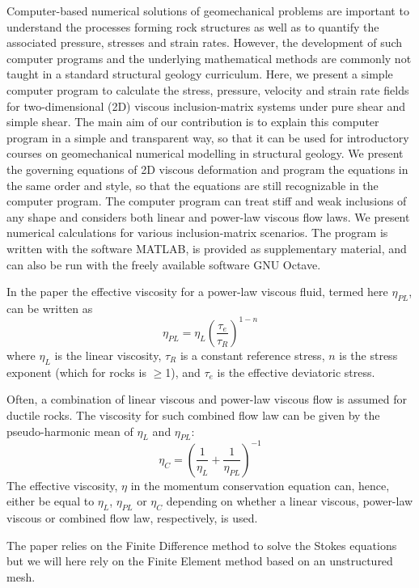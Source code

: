 \begin{center}
\begin{minipage}{13cm}
{\small 
Computer-based numerical solutions of geomechanical problems are important to understand the processes
forming rock structures as well as to quantify the associated pressure, stresses and strain rates. However, the
development of such computer programs and the underlying mathematical methods are commonly not taught in
a standard structural geology curriculum. Here, we present a simple computer program to calculate the stress,
pressure, velocity and strain rate fields for two-dimensional (2D) viscous inclusion-matrix systems under pure
shear and simple shear. The main aim of our contribution is to explain this computer program in a simple and
transparent way, so that it can be used for introductory courses on geomechanical numerical modelling in
structural geology. We present the governing equations of 2D viscous deformation and program the equations in
the same order and style, so that the equations are still recognizable in the computer program. The computer
program can treat stiff and weak inclusions of any shape and considers both linear and power-law viscous flow
laws. We present numerical calculations for various inclusion-matrix scenarios. The program is written with the
software MATLAB, is provided as supplementary material, and can also be run with the freely available software
GNU Octave.}
\end{minipage}
\end{center}
 

In the paper the effective viscosity for a power-law viscous fluid, termed here $\eta_{PL}$, can be written
as
\[
\eta_{PL}=\eta_L \left( \frac{\tau_e}{\tau_R}  \right)^{1-n}
\]
where $\eta_L$ is the linear viscosity, $\tau_R$ is a constant reference stress, 
$n$ is the stress exponent (which for rocks is $\ge$1), and $\tau_e$ is the effective 
deviatoric stress.

Often, a combination of linear viscous and power-law viscous flow is
assumed for ductile rocks. The viscosity for such combined flow law can
be given by the pseudo-harmonic mean of $\eta_L$ and $\eta_{PL}$:
\[
\eta_C = \left(  \frac{1}{\eta_L} + \frac{1}{\eta_{PL}} \right)^{-1}
\]
The effective viscosity, $\eta$ in the momentum conservation equation can, hence, either be
equal to $\eta_L$, $\eta_{PL}$ or $\eta_C$ depending on whether a linear viscous, power-law
viscous or combined flow law, respectively, is used.

The paper relies on the Finite Difference method to solve the Stokes equations but we will here 
rely on the Finite Element method based on an unstructured mesh.

